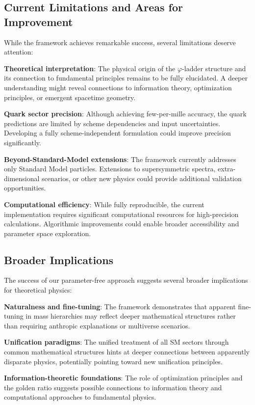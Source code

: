 \documentclass[%
amsmath,amssymb,
aps,
prb,
floatfix,
twocolumn
]{revtex4-2}
\begin{document}
\subsection{Current Limitations and Areas for Improvement}

While the framework achieves remarkable success, several limitations deserve attention:

\textbf{Theoretical interpretation}: The physical origin of the $\varphi$-ladder structure and its connection to fundamental principles remains to be fully elucidated. A deeper understanding might reveal connections to information theory, optimization principles, or emergent spacetime geometry.

\textbf{Quark sector precision}: Although achieving few-per-mille accuracy, the quark predictions are limited by scheme dependencies and input uncertainties. Developing a fully scheme-independent formulation could improve precision significantly.

\textbf{Beyond-Standard-Model extensions}: The framework currently addresses only Standard Model particles. Extensions to supersymmetric spectra, extra-dimensional scenarios, or other new physics could provide additional validation opportunities.

\textbf{Computational efficiency}: While fully reproducible, the current implementation requires significant computational resources for high-precision calculations. Algorithmic improvements could enable broader accessibility and parameter space exploration.

\subsection{Broader Implications}

The success of our parameter-free approach suggests several broader implications for theoretical physics:

\textbf{Naturalness and fine-tuning}: The framework demonstrates that apparent fine-tuning in mass hierarchies may reflect deeper mathematical structures rather than requiring anthropic explanations or multiverse scenarios.

\textbf{Unification paradigms}: The unified treatment of all SM sectors through common mathematical structures hints at deeper connections between apparently disparate physics, potentially pointing toward new unification principles.

\textbf{Information-theoretic foundations}: The role of optimization principles and the golden ratio suggests possible connections to information theory and computational approaches to fundamental physics.
\end{document}
